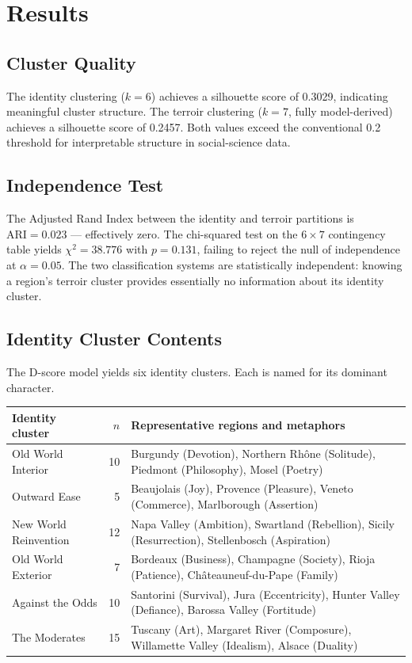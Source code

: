 \documentclass[11pt]{article}
\begin{document}
\section{Results}

\subsection{Cluster Quality}
The identity clustering ($k = 6$) achieves a silhouette score of 0.3029, indicating meaningful cluster structure. The terroir clustering ($k = 7$, fully model-derived) achieves a silhouette score of 0.2457. Both values exceed the conventional 0.2 threshold for interpretable structure in social-science data.

\subsection{Independence Test}
The Adjusted Rand Index between the identity and terroir partitions is $\mathrm{ARI} = 0.023$ --- effectively zero. The chi-squared test on the $6 \times 7$ contingency table yields $\chi^2 = 38.776$ with $p = 0.131$, failing to reject the null of independence at $\alpha = 0.05$. The two classification systems are statistically independent: knowing a region's terroir cluster provides essentially no information about its identity cluster.

\subsection{Identity Cluster Contents}
The D-score model yields six identity clusters. Each is named for its dominant character.

\begin{center}
\begin{tabular}{@{}lrp{8.4cm}@{}}
\toprule
Identity cluster & $n$ & Representative regions and metaphors \\
\midrule
Old World Interior      & 10 & Burgundy (Devotion), Northern Rh\^one (Solitude), Piedmont (Philosophy), Mosel (Poetry) \\
Outward Ease            &  5 & Beaujolais (Joy), Provence (Pleasure), Veneto (Commerce), Marlborough (Assertion) \\
New World Reinvention   & 12 & Napa Valley (Ambition), Swartland (Rebellion), Sicily (Resurrection), Stellenbosch (Aspiration) \\
Old World Exterior      &  7 & Bordeaux (Business), Champagne (Society), Rioja (Patience), Ch\^ateauneuf-du-Pape (Family) \\
Against the Odds        & 10 & Santorini (Survival), Jura (Eccentricity), Hunter Valley (Defiance), Barossa Valley (Fortitude) \\
The Moderates           & 15 & Tuscany (Art), Margaret River (Composure), Willamette Valley (Idealism), Alsace (Duality) \\
\bottomrule
\end{tabular}
\end{center}
\end{document}
